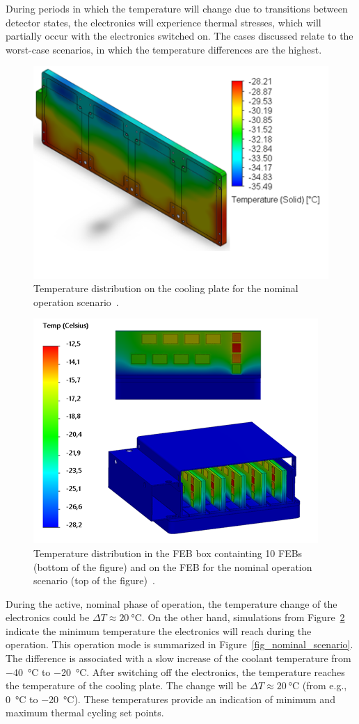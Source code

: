 During periods in which the temperature will change due to transitions between detector states, the electronics will experience thermal stresses, which will partially occur with the electronics switched on. The cases discussed relate to the worst-case scenarios, in which the temperature differences are the highest. 
    
\begin{figure}[!h]
\centering
\includegraphics[width=0.6\columnwidth]{Chapter4/images/cooling_block_nominal.png}
\caption{Temperature distribution on the cooling plate for the nominal operation scenario~\cite{Agarwal}.}
\label{fig_coolinkg_block_nominal}
\end{figure}

\newpage

\begin{figure}[!h]
\centering
\includegraphics[width=0.62\columnwidth]{Chapter4/images/nominal_febs.png}
\caption{Temperature distribution in the \gls{FEB} box containting 10 \glspl{FEB} (bottom of the figure) and on the \gls{FEB} for the nominal operation scenario (top of the figure)~\cite{Agarwal}. }
\label{fig_nominal_febs}
\end{figure}


During the active, nominal phase of operation, the temperature change of the electronics could be $\Delta T \approx \SI{20}{\celsius}$. On the other hand, simulations from Figure~\ref{fig_nominal_febs} indicate the minimum temperature the electronics will reach during the operation. This operation mode is summarized in Figure~\ref{fig_nominal_scenario}.  The difference is associated with a slow increase of the coolant temperature from \SI{-40}{\celsius} to \SI{-20}{\celsius}. After switching off the electronics, the temperature reaches the temperature of the cooling plate. The change will be $\Delta T \approx \SI{20}{\celsius}$ (from e.g., \SI{0}{\celsius} to \SI{-20}{\celsius}). These temperatures provide an indication of minimum and maximum thermal cycling set points.  

